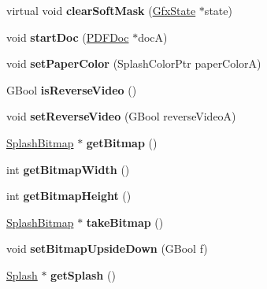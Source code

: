 \begin{DoxyCompactItemize}
virtual void {\bfseries clear\+Soft\+Mask} (\hyperlink{class_gfx_state}{Gfx\+State} $\ast$state)
\item 
\mbox{\label{class_splash_output_dev_a7d9b81549ff12883d50045b4abfdaf69}} 
void {\bfseries start\+Doc} (\hyperlink{class_p_d_f_doc}{P\+D\+F\+Doc} $\ast$docA)
\item 
\mbox{\label{class_splash_output_dev_a0eed52b07fe876e4edc5fde3835d4fbd}} 
void {\bfseries set\+Paper\+Color} (Splash\+Color\+Ptr paper\+ColorA)
\item 
\mbox{\label{class_splash_output_dev_a0b5236a6d6ac7c2fdb9dae387843dd2c}} 
G\+Bool {\bfseries is\+Reverse\+Video} ()
\item 
\mbox{\label{class_splash_output_dev_ae4397e03ba344e30b268e13486fe812a}} 
void {\bfseries set\+Reverse\+Video} (G\+Bool reverse\+VideoA)
\item 
\mbox{\label{class_splash_output_dev_af1ed8c8393cc4d426191afdfdad5cb77}} 
\hyperlink{class_splash_bitmap}{Splash\+Bitmap} $\ast$ {\bfseries get\+Bitmap} ()
\item 
\mbox{\label{class_splash_output_dev_a961fd9478ec09a778438c84083c6fc67}} 
int {\bfseries get\+Bitmap\+Width} ()
\item 
\mbox{\label{class_splash_output_dev_a959029040d24f536ba0f29bb7012c5bf}} 
int {\bfseries get\+Bitmap\+Height} ()
\item 
\mbox{\label{class_splash_output_dev_afd87483aa137365e3aae45bd847b3608}} 
\hyperlink{class_splash_bitmap}{Splash\+Bitmap} $\ast$ {\bfseries take\+Bitmap} ()
\item 
\mbox{\label{class_splash_output_dev_a2da784588c62377f9c63c33279ff6368}} 
void {\bfseries set\+Bitmap\+Upside\+Down} (G\+Bool f)
\item 
\mbox{\label{class_splash_output_dev_ac796ac3e1f6c7434c2bb807832a6d209}} 
\hyperlink{class_splash}{Splash} $\ast$ {\bfseries get\+Splash} ()

\end{DoxyCompactItemize}
